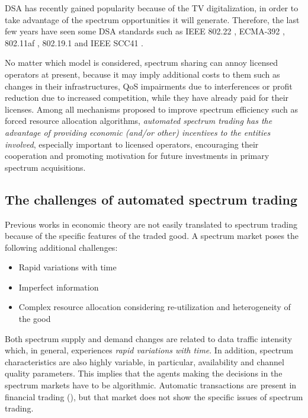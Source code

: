 DSA has recently gained popularity because of the TV digitalization, in order to take advantage of the spectrum opportunities it will generate. Therefore, the last few years have seen some DSA standards such as IEEE 802.22 \cite{ref:802}, ECMA-392 \cite{ref:ECMA}, 802.11af \cite{ref:802.11}, 802.19.1 \cite{ref:802.19.1} and IEEE SCC41 \cite{ref:SCC}. 

No matter which model is considered, spectrum sharing can annoy licensed operators at present, because it may imply additional costs to them such as changes in their infrastructures, QoS impairments due to interferences or profit reduction due to increased competition, while they have already paid for their licenses. Among all mechanisms proposed to improve spectrum efficiency such as forced resource allocation algorithms,\textit{ automated spectrum trading has the advantage of providing economic (and/or other) incentives to the entities involved}, especially important to licensed operators, encouraging their cooperation and promoting motivation for future investments in primary spectrum acquisitions. 

\subsection{The challenges of automated spectrum trading}
Previous works in economic theory are not easily translated to spectrum trading because of the specific features of the traded good. A spectrum market poses the following additional challenges:
\begin{itemize}
\item{Rapid variations with time}
\item{Imperfect information}
\item{Complex resource allocation considering re-utilization and heterogeneity of the good}
\end{itemize}

Both spectrum supply and demand changes are related to data traffic intensity which, in general, experiences \textit{rapid variations with time}. 
In addition, spectrum characteristics are also highly variable, in particular, availability and channel quality parameters. This implies that the agents making the decisions in the spectrum markets have to be algorithmic. Automatic transactions are present in financial trading (\cite{ref:Adler2012}), but that market does not show the specific issues of spectrum trading. 

